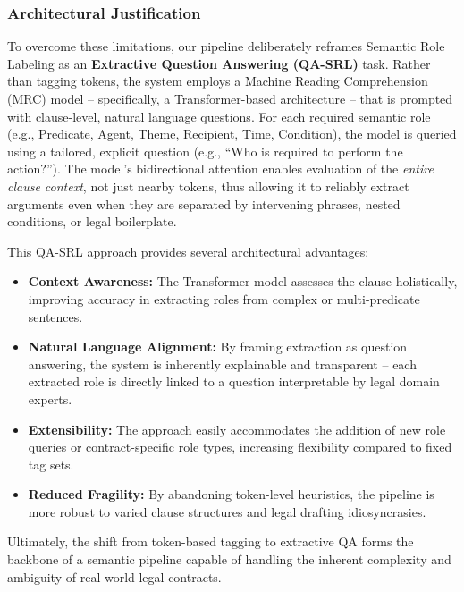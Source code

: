 \documentclass[twoside,final]{hcmut-report}
\begin{document}
\subsubsection{Architectural Justification}
To overcome these limitations, our pipeline deliberately reframes Semantic Role Labeling as an \textbf{Extractive Question Answering (QA-SRL)} task. Rather than tagging tokens, the system employs a Machine Reading Comprehension (MRC) model -- specifically, a Transformer-based architecture -- that is prompted with clause-level, natural language questions. For each required semantic role (e.g., Predicate, Agent, Theme, Recipient, Time, Condition), the model is queried using a tailored, explicit question (e.g., ``Who is required to perform the action?''). The model's bidirectional attention enables evaluation of the \emph{entire clause context}, not just nearby tokens, thus allowing it to reliably extract arguments even when they are separated by intervening phrases, nested conditions, or legal boilerplate.

This QA-SRL approach provides several architectural advantages:
\begin{itemize}[topsep=0pt, parsep=0pt, itemsep=0pt]
  \item \textbf{Context Awareness:} The Transformer model assesses the clause holistically, improving accuracy in extracting roles from complex or multi-predicate sentences.
  \item \textbf{Natural Language Alignment:} By framing extraction as question answering, the system is inherently explainable and transparent -- each extracted role is directly linked to a question interpretable by legal domain experts.
  \item \textbf{Extensibility:} The approach easily accommodates the addition of new role queries or contract-specific role types, increasing flexibility compared to fixed tag sets.
  \item \textbf{Reduced Fragility:} By abandoning token-level heuristics, the pipeline is more robust to varied clause structures and legal drafting idiosyncrasies.
\end{itemize}

Ultimately, the shift from token-based tagging to extractive QA forms the backbone of a semantic pipeline capable of handling the inherent complexity and ambiguity of real-world legal contracts.
\end{document}
